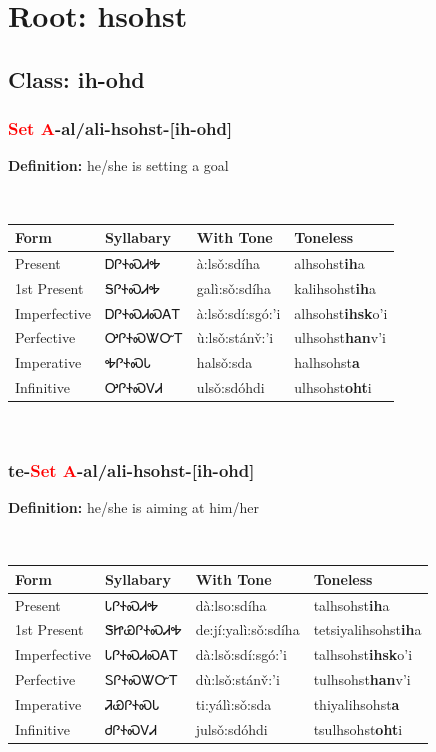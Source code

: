 \needspace{4in}
\section*{Root: hsohst}
\nopagebreak
{}
\needspace{3in}
\subsection*{Class: ih-ohd}
\nopagebreak
\needspace{2in}
\subsubsection*{\textcolor{Red}{Set A}{-}al/ali{-}\textbf{hsohst}{-}[ih-ohd]}
\nopagebreak
\textbf{Definition: } he/she is setting a goal
\\[0.5em]
\begin{tabularx}{\textwidth}{l X X X}%
\toprule%
\textbf{Form}&\textbf{Syllabary}&\textbf{With Tone}&\textbf{Toneless}\\%
\midrule%
Present&ᎠᎵᏐᏍᏗᎭ&à:lsǒ:sdíha&alhsohst\textbf{ih}a\\%
1st Present&ᎦᎵᏐᏍᏗᎭ&galì:sǒ:sdíha&kalihsohst\textbf{ih}a\\%
Imperfective&ᎠᎵᏐᏍᏗᏍᎪᎢ&à:lsǒ:sdí:sgó:’i&alhsohst\textbf{ihsk}o'i\\%
Perfective&ᎤᎵᏐᏍᏔᏅᎢ&ù:lsǒ:stánv̌:’i&ulhsohst\textbf{han}v'i\\%
Imperative&ᎭᎵᏐᏍᏓ&halsǒ:sda&halhsohst\textbf{a}\\%
Infinitive&ᎤᎵᏐᏍᏙᏗ&ulsǒ:sdóhdi&ulhsohst\textbf{oht}i\\%
\bottomrule%
\end{tabularx}
\\[1em]
\needspace{2in}
\subsubsection*{te{-}\textcolor{Red}{Set A}{-}al/ali{-}\textbf{hsohst}{-}[ih-ohd]}
\nopagebreak
\textbf{Definition: } he/she is aiming at him/her
\\[0.5em]
\begin{tabularx}{\textwidth}{l X X X}%
\toprule%
\textbf{Form}&\textbf{Syllabary}&\textbf{With Tone}&\textbf{Toneless}\\%
\midrule%
Present&ᏓᎵᏐᏍᏗᎭ&dà:lso:sdíha&talhsohst\textbf{ih}a\\%
1st Present&ᏕᏥᏯᎵᏐᏍᏗᎭ&de:jí:yalì:sǒ:sdíha&tetsiyalihsohst\textbf{ih}a\\%
Imperfective&ᏓᎵᏐᏍᏗᏍᎪᎢ&dà:lsǒ:sdí:sgó:’i&talhsohst\textbf{ihsk}o'i\\%
Perfective&ᏚᎵᏐᏍᏔᏅᎢ&dù:lsǒ:stánv̌:’i&tulhsohst\textbf{han}v'i\\%
Imperative&ᏘᏯᎵᏐᏍᏓ&ti:yálì:sǒ:sda&thiyalihsohst\textbf{a}\\%
Infinitive&ᏧᎵᏐᏍᏙᏗ&julsǒ:sdóhdi&tsulhsohst\textbf{oht}i\\%
\bottomrule%
\end{tabularx}
\\[1em]